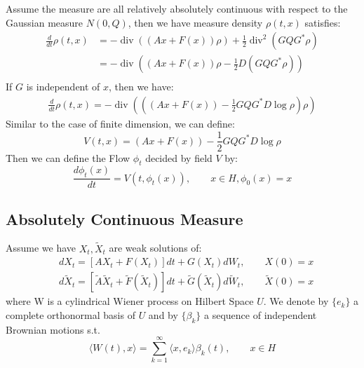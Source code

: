 Assume the measure are all relatively absolutely continuous with respect to the Gaussian measure $N(0, Q)$, then we have measure density $\rho(t, x)$ satisfies:
\begin{equation}
    \begin{aligned}
        \frac{d}{dt} \rho(t, x) &= -\operatorname{div}\left((Ax + F(x))\rho\right) + \frac{1}{2}\operatorname{div}^2\left(GQG^*\rho\right)\\
        &= -\operatorname{div}\left(\left(Ax + F(x)\right)\rho - \frac{1}{2}D\left(GQG^*\rho\right)\right)\\
    \end{aligned}
\end{equation}
If $G$ is independent of $x$, then we have:
\begin{equation}
    \begin{aligned}
        \frac{d}{dt} \rho(t, x) = -\operatorname{div}\left(\left((Ax + F(x)) - \frac{1}{2}GQG^*D\log\rho\right)\rho\right)
    \end{aligned}
\end{equation}
Similar to the case of finite dimension, we can define:
\begin{equation}
    V(t, x) = (Ax + F(x)) - \frac{1}{2}GQG^*D\log\rho
\end{equation}
Then we can define the Flow $\phi_t$ decided by field $V$ by:
\begin{equation}
    \frac{d\phi_t(x)}{dt} = V(t, \phi_t(x)), \qquad x\in H, \phi_0(x) = x
\end{equation}

\subsection{Absolutely Continuous Measure}
Assume we have $X_t,\tilde{X}_t$ are weak solutions of:
\begin{equation}
    \begin{aligned}
        &dX_t = [AX_t + F(X_t)]dt + G(X_t)dW_t,\qquad X(0)=x\\
        &d\tilde{X}_t = [\tilde{A}\tilde{X}_t + \tilde{F}(\tilde{X}_t)]dt + \tilde{G}(\tilde{X}_t)d\tilde{W}_t,\qquad \tilde{X}(0)=x
    \end{aligned}
\end{equation}
where W is a cylindrical Wiener process on Hilbert Space $U$. We denote by $\{e_k\}$ a complete orthonormal basis of $U$ and by $\{\beta_k\}$ a sequence of independent Brownian motions s.t.
\begin{equation}
    \langle W(t), x\rangle = \sum_{k=1}^\infty \langle x, e_k\rangle \beta_k(t), \qquad x\in H
\end{equation}

